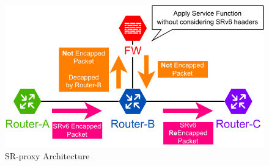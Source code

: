 \begin{figure}[t]
    \centering
    \includegraphics[width=0.95\linewidth]{img/SR-proxy.pdf}
    \caption{SR-proxy Architecture}
    \label{fig:sr-proxy}
\end{figure}





